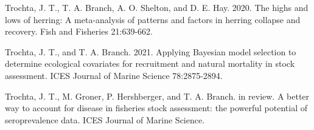 \documentclass[
  11pt,
]{article}
\begin{document}
Trochta, J. T., T. A. Branch, A. O. Shelton, and D. E. Hay. 2020. The
highs and lows of herring: A meta-analysis of patterns and factors in
herring collapse and recovery. Fish and Fisheries 21:639-662.

Trochta, J. T., and T. A. Branch. 2021. Applying Bayesian model
selection to determine ecological covariates for recruitment and natural
mortality in stock assessment. ICES Journal of Marine Science
78:2875-2894.

Trochta, J. T., M. Groner, P. Hershberger, and T. A. Branch. in review.
A better way to account for disease in fisheries stock assessment: the
powerful potential of seroprevalence data. ICES Journal of Marine
Science.
\end{document}
